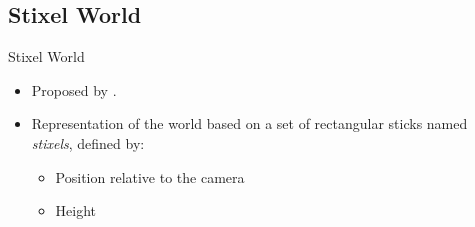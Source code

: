 \graphicspath{
  {./images/bmps/}{./images/vects/}{./images/}
  {./images/presentation/bmps/}{./images/presentation/vects/}{./images/presentation/}
  {./images/chapter00/bmps/}{./images/chapter00/vects/}{./images/chapter00/}
  {./images/chapter04/bmps/}{./images/chapter04/vects/}{./images/chapter04/}
}

\subsection{Stixel World}

\begin{frame}{Stixel World}
  \begin{overlayarea}{\textwidth}{\textheight}
    \begin{itemize}
      \item<1-> Proposed by \cite{badino2009stixel}.
      \item<1-> Representation of the world based on a set of rectangular sticks named \emph{stixels}, defined by:
      \begin{itemize}
      \item<1-> Position relative to the camera
      \item<1-> Height
      \end{itemize}
      

\end{itemize}
\end{overlayarea}
\end{frame}

